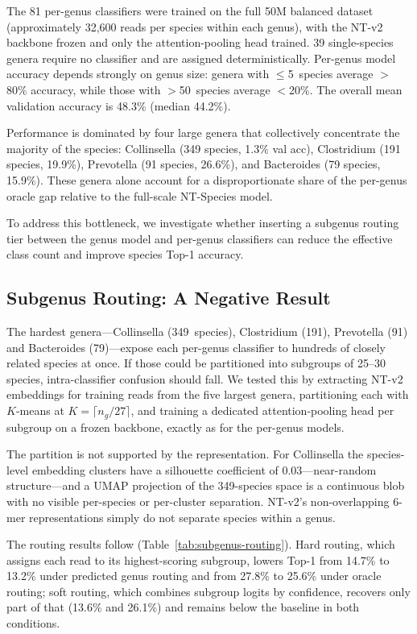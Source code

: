 The 81 per-genus classifiers were trained on the full 50M balanced dataset (approximately 32,600 reads per species within each genus), with the NT-v2 backbone frozen and only the attention-pooling head trained.
39 single-species genera require no classifier and are assigned deterministically.
Per-genus model accuracy depends strongly on genus size: genera with $\leq$5~species average $>$80\% accuracy, while those with $>$50~species average $<$20\%.
The overall mean validation accuracy is 48.3\% (median 44.2\%).

Performance is dominated by four large genera that collectively concentrate the majority of the species:
Collinsella (349 species, 1.3\% val acc), Clostridium (191 species, 19.9\%), Prevotella (91 species, 26.6\%), and Bacteroides (79 species, 15.9\%).
These genera alone account for a disproportionate share of the per-genus oracle gap relative to the full-scale NT-Species model.

To address this bottleneck, we investigate whether inserting a subgenus routing tier between the genus model and per-genus classifiers can reduce the effective class count and improve species Top-1 accuracy.

\subsection{Subgenus Routing: A Negative Result}
\label{sec:subgenus-routing}

The hardest genera---Collinsella (349~species), Clostridium (191), Prevotella (91)
and Bacteroides (79)---expose each per-genus classifier to hundreds of closely
related species at once. If those could be partitioned into subgroups of 25--30
species, intra-classifier confusion should fall. We tested this by extracting NT-v2
embeddings for training reads from the five largest genera, partitioning each with
$K$-means at $K = \lceil n_g / 27 \rceil$, and training a dedicated attention-pooling
head per subgroup on a frozen backbone, exactly as for the per-genus models.

The partition is not supported by the representation. For Collinsella the
species-level embedding clusters have a silhouette coefficient of $0.03$---near-random
structure---and a UMAP projection of the 349-species space is a continuous blob with
no visible per-species or per-cluster separation. NT-v2's non-overlapping 6-mer
representations simply do not separate species within a genus.

The routing results follow (Table~\ref{tab:subgenus-routing}). Hard routing, which
assigns each read to its highest-scoring subgroup, lowers Top-1 from 14.7\% to 13.2\%
under predicted genus routing and from 27.8\% to 25.6\% under oracle routing; soft
routing, which combines subgroup logits by confidence, recovers only part of that
(13.6\% and 26.1\%) and remains below the baseline in both conditions.

